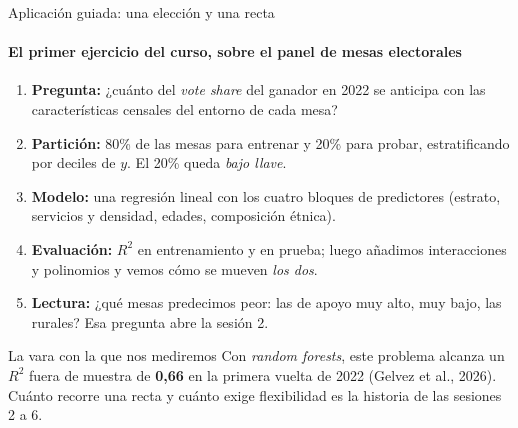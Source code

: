 \documentclass{beamer}
\newcommand{\1}{\mathbb{I}}
\begin{document}
\begin{frame}{Aplicación guiada: una elección y una recta}
\framesubtitle{El primer ejercicio del curso, sobre el panel de mesas electorales}
\small
\begin{enumerate}\itemsep2pt
  \item \textbf{Pregunta:} ¿cuánto del \emph{vote share} del ganador en 2022 se anticipa con las características censales del entorno de cada mesa? \pause
  \item \textbf{Partición:} 80\% de las mesas para entrenar y 20\% para probar, estratificando por deciles de $y$. El 20\% queda \emph{bajo llave}. \pause
  \item \textbf{Modelo:} una regresión lineal con los cuatro bloques de predictores (estrato, servicios y densidad, edades, composición étnica). \pause
  \item \textbf{Evaluación:} $R^2$ en entrenamiento y en prueba; luego añadimos interacciones y polinomios y vemos cómo se mueven \emph{los dos}. \pause
  \item \textbf{Lectura:} ¿qué mesas predecimos peor: las de apoyo muy alto, muy bajo, las rurales? Esa pregunta abre la sesión 2.
\end{enumerate}
\pause

\begin{block}{La vara con la que nos mediremos}
Con \emph{random forests}, este problema alcanza un $R^2$ fuera de muestra de \textbf{0,66} en la primera vuelta de 2022 (Gelvez et al., 2026). Cuánto recorre una recta y cuánto exige flexibilidad es la historia de las sesiones 2 a 6.
\end{block}
\end{frame}
\end{document}
